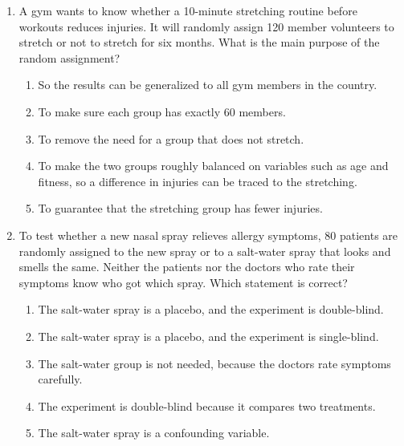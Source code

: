 \documentclass[12pt]{article}
\begin{document}
\begin{enumerate}[leftmargin=1.9em, itemsep=0.13in]
  \boxguard[14]
  \item A gym wants to know whether a 10-minute stretching routine before workouts reduces
        injuries. It will randomly assign 120 member volunteers to stretch or not to stretch
        for six months. What is the main purpose of the random assignment?
        \begin{enumerate}[label=\textbf{(\Alph*)}, leftmargin=2.2em, itemsep=2pt]
          \item So the results can be generalized to all gym members in the country.
          \item To make sure each group has exactly 60 members.
          \item To remove the need for a group that does not stretch.
          \item To make the two groups roughly balanced on variables such as age and fitness,
                so a difference in injuries can be traced to the stretching.
          \item To guarantee that the stretching group has fewer injuries.\hfill{}\rule[-0.2in]{0pt}{0.48in}
        \end{enumerate}

  \boxguard[15]
  \item To test whether a new nasal spray relieves allergy symptoms, 80 patients are randomly
        assigned to the new spray or to a salt-water spray that looks and smells the same.
        Neither the patients nor the doctors who rate their symptoms know who got which spray.
        Which statement is correct?
        \begin{enumerate}[label=\textbf{(\Alph*)}, leftmargin=2.2em, itemsep=2pt]
          \item The salt-water spray is a placebo, and the experiment is double-blind.
          \item The salt-water spray is a placebo, and the experiment is single-blind.
          \item The salt-water group is not needed, because the doctors rate symptoms carefully.
          \item The experiment is double-blind because it compares two treatments.
          \item The salt-water spray is a confounding variable.\hfill{}\rule[-0.2in]{0pt}{0.48in}
        \end{enumerate}


\end{enumerate}
\end{document}
